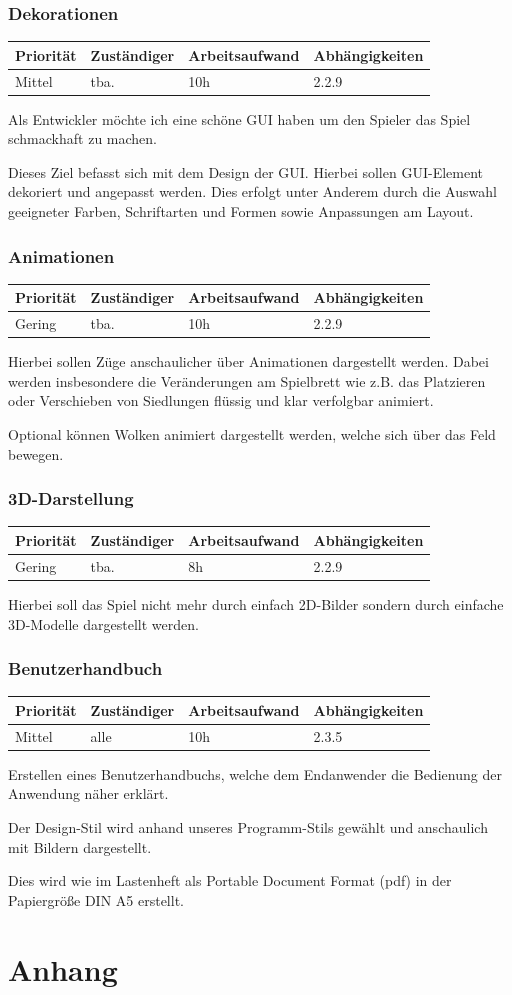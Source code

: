 \documentclass[a4paper]{scrreprt}
\newenvironment{requirement}[5] {
	\subsection{#1}
	\begin{tabularx}{\textwidth}{|X|l|X|X|}
		\hline
		Priorität & Zuständiger & Arbeitsaufwand & Abhängigkeiten \\
		\hline
		#2 & #3 & #4 & #5 \\
		\hline
	\end{tabularx}
	}{
	\newpage
	}
\begin{document}
\begin{requirement}{Dekorationen}{Mittel}{tba.}{10h}{2.2.9}

\begin{center}
	Als Entwickler möchte ich eine \glqq schöne \grqq{} GUI haben um den Spieler das Spiel schmackhaft zu machen.
\end{center}

Dieses Ziel befasst sich mit dem Design der GUI. Hierbei sollen GUI-Element dekoriert und angepasst werden. Dies erfolgt unter Anderem durch die Auswahl geeigneter Farben, Schriftarten und Formen sowie Anpassungen am Layout.


\end{requirement}


\begin{requirement}{Animationen}{Gering}{tba.}{10h}{2.2.9}

Hierbei sollen Züge anschaulicher über Animationen dargestellt werden. Dabei werden insbesondere die Veränderungen am Spielbrett wie z.B. das Platzieren oder Verschieben von Siedlungen flüssig und klar verfolgbar animiert.

Optional können Wolken animiert dargestellt werden, welche sich über das Feld bewegen.

\end{requirement}


\begin{requirement}{3D-Darstellung}{Gering}{tba.}{8h}{2.2.9}

Hierbei soll das Spiel nicht mehr durch einfach 2D-Bilder sondern durch einfache 3D-Modelle dargestellt werden.

\end{requirement}

\begin{requirement}{Benutzerhandbuch}{Mittel}{alle}{10h}{2.3.5}

Erstellen eines Benutzerhandbuchs, welche dem Endanwender die Bedienung der Anwendung näher erklärt.

Der Design-Stil wird anhand unseres Programm-Stils gewählt und anschaulich mit Bildern dargestellt.

Dies wird wie im Lastenheft als Portable Document Format (pdf) in der Papiergröße DIN A5 erstellt.

\end{requirement}


\chapter{Anhang}
\end{document}
